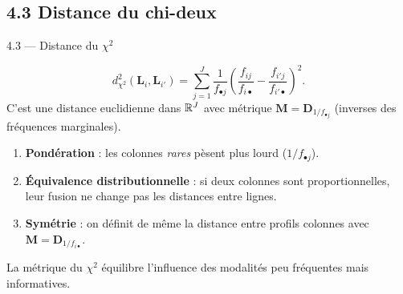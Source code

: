 \subsection{4.3 Distance du chi-deux}
\begin{frame}{4.3 — Distance du $\chi^2$}
\begin{definition}
\[
d_{\chi^2}^2(\mathbf{L}_i, \mathbf{L}_{i'})
= \sum_{j=1}^J \frac{1}{f_{\bullet j}}
  \left(\frac{f_{ij}}{f_{i\bullet}} - \frac{f_{i'j}}{f_{i'\bullet}}\right)^2.
\]
C'est une distance euclidienne dans $\mathbb{R}^J$ avec \alert{métrique
$\mathbf{M} = \mathbf{D}_{1/f_{\bullet j}}$} (inverses des fréquences marginales).
\end{definition}

\begin{prop}
\begin{enumerate}
  \item \textbf{Pondération} : les colonnes \emph{rares} pèsent plus lourd
        ($1/f_{\bullet j}$).
  \item \textbf{Équivalence distributionnelle} : si deux colonnes sont
        proportionnelles, leur fusion ne change pas les distances entre lignes.
  \item \textbf{Symétrie} : on définit de même la distance entre profils
        colonnes avec $\mathbf{M} = \mathbf{D}_{1/f_{i\bullet}}$.
\end{enumerate}
\end{prop}

\begin{rema}
\small La métrique du $\chi^2$ \alert{équilibre l'influence} des modalités peu
fréquentes mais informatives.
\end{rema}
\end{frame}

